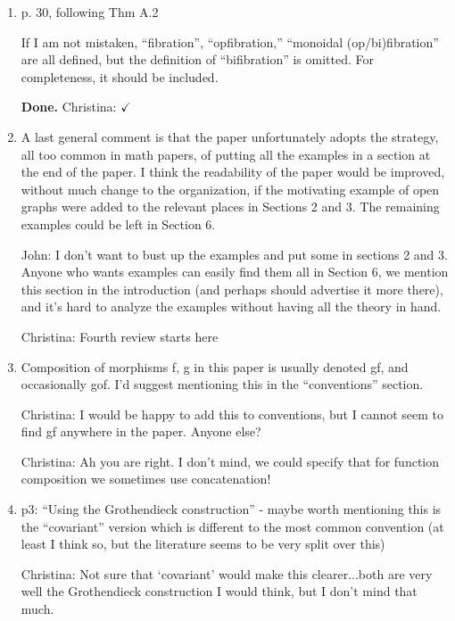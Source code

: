 \documentclass[reqno]{amsart}
\def\chris{\color{purple} Christina: }
\def\john{\color{red} John: }
\begin{document}
\begin{enumerate}
\item p. 30, following Thm A.2

If I am not mistaken, “fibration”, “opfibration,” “monoidal (op/bi)fibration” are all defined, but the definition of “bifibration” is omitted. For 
completeness, it should be included.

{\bf Done.} {\chris $\checkmark$}

\item A last general comment is that the paper unfortunately adopts the strategy, all too common in math papers, of putting all the examples in a 
section at 
the end of the paper. I think the readability of the paper would be improved, without much change to the organization, if the motivating example of 
open graphs were added to the relevant places in Sections 2 and 3. The remaining examples could be left in Section 6.

{\john
I don't want to bust up the examples and put some in sections 2 and 3. Anyone who wants examples can easily find them all in Section 6, we mention 
this section in the introduction (and perhaps should advertise it more there), and it's hard to analyze the examples without having all the theory in 
hand.}


{\chris Fourth review starts here}
\item Composition of morphisms f, g in this paper is usually denoted gf, and occasionally gof. I’d suggest mentioning this in the “conventions” 
section.

{\chris I would be happy to add this to conventions, but I cannot seem to find gf anywhere in the paper. Anyone else?}

{\color{blue}{Kenny: They might not mean $gf$ specifically, but there are many instances where we don't use a $\circ$ for functional composition, e.g. 
when we're pushing forward a graph structure over a map $f$ of vertices towards the top of page 21. Do we want to use a $\circ$ or not?}}

{\chris Ah you are right. I don't mind, we could specify that for function composition we sometimes use concatenation!}

\item p3: “Using the Grothendieck construction” - maybe worth mentioning this is the “covariant” version which is different to the most common 
convention 
(at least I think so, but the literature seems to be very split over this)

{\chris Not sure that `covariant' would make this clearer...both are very well the Grothendieck construction I would think, but I don't mind that 
much.}


\end{enumerate}
\end{document}
